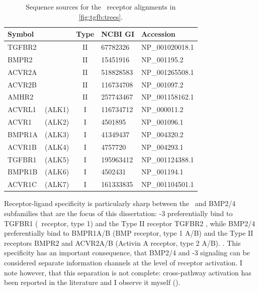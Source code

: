 	
	
    \begin{table}[!bt]
    \centering
	\footnotesize
    \caption[List of \tgfbsf\ receptors]{ Sequence sources for the 
    \tgfbsf\ receptor alignments in \autoref{fig:tgfb:trees}. }
    \label{table:pathways:methods:tgfbReceptor}
    \begin{tabular}{llcll}
    \hline
    Symbol   &        & Type  & NCBI GI    & Accession       \\ \hline
	TGFBR2   &        & II    & 67782326   & NP\_001020018.1 \\
	BMPR2    &        & II    & 15451916   & NP\_001195.2    \\
	ACVR2A   &        & II    & 518828583  & NP\_001265508.1 \\
	ACVR2B   &        & II    & 116734708  & NP\_001097.2    \\
	AMHR2    &        & II    & 257743467  & NP\_001158162.1 \\
	ACVRL1   & (ALK1) & I     & 116734712  & NP\_000011.2    \\
	ACVR1    & (ALK2) & I     & 4501895    & NP\_001096.1    \\
	BMPR1A   & (ALK3) & I     & 41349437   & NP\_004320.2    \\
	ACVR1B   & (ALK4) & I     & 4757720    & NP\_004293.1    \\
	TGFBR1   & (ALK5) & I     & 195963412  & NP\_001124388.1 \\
	BMPR1B   & (ALK6) & I     & 4502431    & NP\_001194.1    \\
	ACVR1C   & (ALK7) & I     & 161333835  & NP\_001104501.1 \\
    \hline
    \end{tabular}
    \end{table}


Receptor-ligand specificity is particularly sharp between the \tgf\ and BMP2/4 subfamilies
that are the focus of this dissertation: -3
preferentially bind to TGFBR1 (\tgf\ receptor, type 1)
and the Type II receptor TGFBR2 \cite{Inman2002}, while
BMP2/4 preferentially bind to BMPR1A/B (BMP receptor, type 1 A/B)
and the Type II receptors BMPR2 and ACVR2A/B (Activin A receptor, type 2 A/B).
\cite{Miyazono2005}. This specificity has an important consequence, that
BMP2/4 and -3 signaling can be considered separate information channels
at the level of receptor activation. I note however, that this separation is
not complete: cross-pathway activation has been reported in the literature
\cite{Daly2008,Goumans2003,Liu2009,Wrighton2009}
and I observe it myself ().


